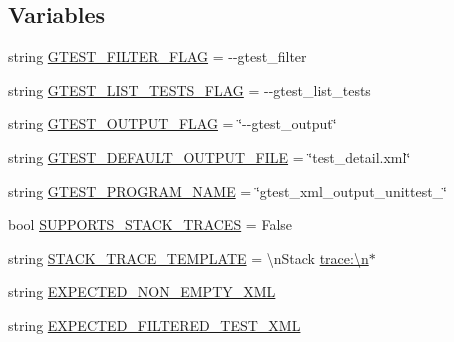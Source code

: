 \subsection*{Variables}
\begin{DoxyCompactItemize}
\item 
string \hyperlink{namespacegtest__xml__output__unittest_ab914acfbfbc3f6f5ee3f1e83134c7204}{G\+T\+E\+S\+T\+\_\+\+F\+I\+L\+T\+E\+R\+\_\+\+F\+L\+AG} = \textquotesingle{}-\/-\/gtest\+\_\+filter\textquotesingle{}
\item 
string \hyperlink{namespacegtest__xml__output__unittest_aafe4dd234e72bbb61f4f34689fbca5c4}{G\+T\+E\+S\+T\+\_\+\+L\+I\+S\+T\+\_\+\+T\+E\+S\+T\+S\+\_\+\+F\+L\+AG} = \textquotesingle{}-\/-\/gtest\+\_\+list\+\_\+tests\textquotesingle{}
\item 
string \hyperlink{namespacegtest__xml__output__unittest_a96dc60b3ea1b2ced315835227f77e10d}{G\+T\+E\+S\+T\+\_\+\+O\+U\+T\+P\+U\+T\+\_\+\+F\+L\+AG} = \char`\"{}-\/-\/gtest\+\_\+output\char`\"{}
\item 
string \hyperlink{namespacegtest__xml__output__unittest_a5591d7d52a46da09d06ed3e9ec18711a}{G\+T\+E\+S\+T\+\_\+\+D\+E\+F\+A\+U\+L\+T\+\_\+\+O\+U\+T\+P\+U\+T\+\_\+\+F\+I\+LE} = \char`\"{}test\+\_\+detail.\+xml\char`\"{}
\item 
string \hyperlink{namespacegtest__xml__output__unittest_ab89cc5b402310ef67bcaf38fa5017461}{G\+T\+E\+S\+T\+\_\+\+P\+R\+O\+G\+R\+A\+M\+\_\+\+N\+A\+ME} = \char`\"{}gtest\+\_\+xml\+\_\+output\+\_\+unittest\+\_\+\char`\"{}
\item 
bool \hyperlink{namespacegtest__xml__output__unittest_af342633908d453cee6e700fe6b73ef82}{S\+U\+P\+P\+O\+R\+T\+S\+\_\+\+S\+T\+A\+C\+K\+\_\+\+T\+R\+A\+C\+ES} = False
\item 
string \hyperlink{namespacegtest__xml__output__unittest_abd57c1a4124b74d2ba63d03734df491d}{S\+T\+A\+C\+K\+\_\+\+T\+R\+A\+C\+E\+\_\+\+T\+E\+M\+P\+L\+A\+TE} = \textquotesingle{}\textbackslash{}n\+Stack \hyperlink{app_2main_8cpp_acfc02ec89670db29251fda6a66602ce2}{trace\+:\textbackslash{}n}$\ast$\textquotesingle{}
\item 
string \hyperlink{namespacegtest__xml__output__unittest_ab6a01b4b81a702e476f53b1b3c4983c0}{E\+X\+P\+E\+C\+T\+E\+D\+\_\+\+N\+O\+N\+\_\+\+E\+M\+P\+T\+Y\+\_\+\+X\+ML}
\item 
string \hyperlink{namespacegtest__xml__output__unittest_a1adb060422f833cb8b99403d13144399}{E\+X\+P\+E\+C\+T\+E\+D\+\_\+\+F\+I\+L\+T\+E\+R\+E\+D\+\_\+\+T\+E\+S\+T\+\_\+\+X\+ML}
\item 

\end{DoxyCompactItemize}
